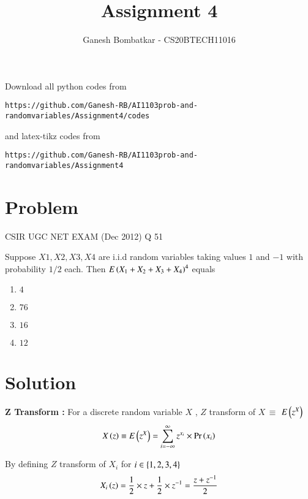 \documentclass[journal,12pt,twocolumn]{IEEEtran}
\begin{document}
     \def\rightbox#1{\makebox[0in][r]{#1}}
     \def\centbox#1{\makebox[0in]{#1}}
     \def\topbox#1{\raisebox{-\baselineskip}[0in][0in]{#1}}
     \def\midbox#1{\raisebox{-0.5\baselineskip}[0in][0in]{#1}}
\vspace{3cm}
\title{Assignment 4}
\author{Ganesh Bombatkar - CS20BTECH11016}
\maketitle
\newpage
\bigskip
\renewcommand{\thefigure}{\theenumi}
\renewcommand{\thetable}{\theenumi}
Download all python codes from 
\begin{lstlisting}
https://github.com/Ganesh-RB/AI1103prob-and-randomvariables/Assignment4/codes
\end{lstlisting}
%
and latex-tikz codes from 
%
\begin{lstlisting}
https://github.com/Ganesh-RB/AI1103prob-and-randomvariables/Assignment4
\end{lstlisting}

\section{Problem}
{
\centering CSIR UGC NET EXAM (Dec 2012) Q 51

}
Suppose $X1,X2,X3,X4$ are i.i.d random variables taking values $1$ and $-1$ with probability $1/2$ each. Then $E\left(X_1+X_2 +X_3 +X_4\right)^4$ equals
\begin{multicols}{4}
\begin{enumerate}
    \item $4$
    \item $76$
    \item $16$
    \item $12$
\end{enumerate}
\end{multicols}

\section{Solution}
\textbf{Z Transform : }
For a discrete random variable $X$ , $Z$ transform of $X \, \equiv$ $E\left(z^X\right)$
\begin{align}
    X\left(z\right) \equiv E\left(z^X\right) = \sum_{i=-\infty}^{\infty} z^{x_i}\times\Pr\left(x_i\right)
\end{align}

By defining ${Z}$ transform of $X_i$ for $i \in \left\{1,2,3,4\right\} $
\begin{align}
    X_i\left(z\right)=\frac{1}{2}\times z + \frac{1}{2} \times z^{-1}=\frac{z+z^{-1}}{2}
\end{align}
\end{document}
